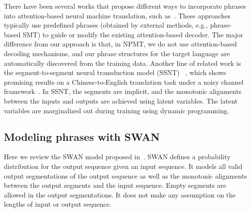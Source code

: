 \documentclass{article}
\begin{document}
There have been several works that propose different ways to incorporate phrases
into attention-based neural machine translation, such
as~\cite{Tang2016neural,Wang:2017emnlp,dahlmann-EtAl:2017:EMNLP2017}. These
approaches typically use predefined phrases (obtained by external methods, e.g.,
phrase-based SMT) to guide or modify the existing attention-based decoder. The
major difference from our approach is that, in NPMT, we do not use 
attention-based decoding mechanisms, and our phrase structures for the target
language are automatically discovered from the training data. Another line of
related work is the segment-to-segment neural transduction model (SSNT)
~\citep{yu-buys-blunsom:2016:EMNLP2016}, which shows promising results on a
Chinese-to-English translation task under a noisy channel
framework~\citep{yu2016neural}. In SSNT, the segments are implicit, and the
monotonic alignments between the inputs and outputs are achieved using latent
variables. The latent variables are marginalized out during training using dynamic programming.

\subsection{Modeling phrases with SWAN}
\label{sec:swan}
Here we review the SWAN model proposed in~\cite{wang2017sequence}. SWAN defines
a probability distribution for the output sequence given an input sequence. It
models all valid output segmentations of the output sequence as well as the
monotonic alignments between the output segments and the input sequence. Empty
segments are allowed in the output segmentations. It does not make any
assumption on the lengths of input or output sequence. 
\end{document}
